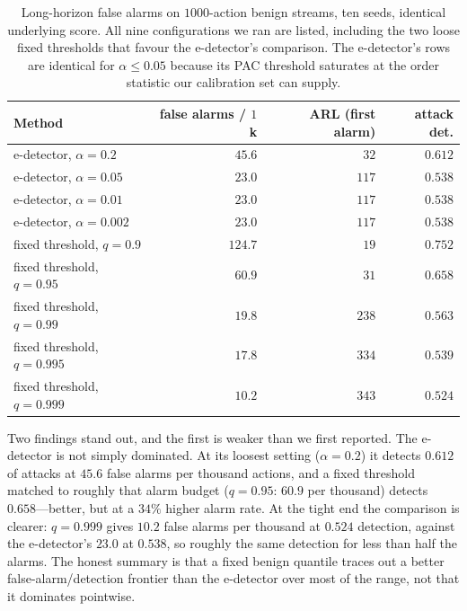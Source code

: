 \documentclass[preprint,12pt,authoryear]{elsarticle}
\theoremstyle{definition}
\begin{document}
\begin{table}[htbp]
\centering
\caption{Long-horizon false alarms on $1000$-action benign streams, ten seeds,
identical underlying score. All nine configurations we ran are listed, including
the two loose fixed thresholds that favour the e-detector's comparison. The
e-detector's rows are identical for $\alpha \le 0.05$ because its PAC threshold
saturates at the order statistic our calibration set can supply.}
\label{tab:longhorizon}
\small
\begin{tabular}{@{}lrrr@{}}
\toprule
Method & false alarms / $1$k & ARL (first alarm) & attack det. \\
\midrule
e-detector, $\alpha=0.2$ & $45.6$ & $32$ & $0.612$ \\
e-detector, $\alpha=0.05$ & $23.0$ & $117$ & $0.538$ \\
e-detector, $\alpha=0.01$ & $23.0$ & $117$ & $0.538$ \\
e-detector, $\alpha=0.002$ & $23.0$ & $117$ & $0.538$ \\
fixed threshold, $q=0.9$ & $124.7$ & $19$ & $0.752$ \\
fixed threshold, $q=0.95$ & $60.9$ & $31$ & $0.658$ \\
fixed threshold, $q=0.99$ & $19.8$ & $238$ & $0.563$ \\
fixed threshold, $q=0.995$ & $17.8$ & $334$ & $0.539$ \\
fixed threshold, $q=0.999$ & $10.2$ & $343$ & $0.524$ \\
\bottomrule
\end{tabular}
\end{table}

Two findings stand out, and the first is weaker than we first reported. The
e-detector is not simply dominated. At its loosest setting ($\alpha = 0.2$) it
detects $0.612$ of attacks at $45.6$ false alarms per thousand actions, and a fixed
threshold matched to roughly that alarm budget ($q = 0.95$: $60.9$ per thousand)
detects $0.658$---better, but at a $34\%$ higher alarm rate. At the tight end the
comparison is clearer: $q = 0.999$ gives $10.2$ false alarms per thousand at
$0.524$ detection, against the e-detector's $23.0$ at $0.538$, so roughly the same
detection for less than half the alarms. The honest summary is that a fixed benign
quantile traces out a better false-alarm/detection frontier than the e-detector
over most of the range, not that it dominates pointwise.
\end{document}
